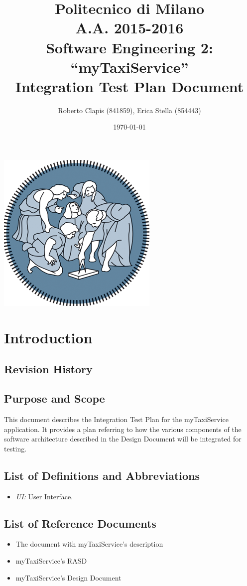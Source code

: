 \documentclass{article}
\author{Roberto Clapis (841859), Erica Stella (854443)}
\date{\today}
\title{Politecnico di Milano
	\\A.A. 2015\@-\@2016
	\\Software Engineering 2: ``myTaxiService''
	\\\textbf{I}ntegration \textbf{T}est \textbf{P}lan \textbf{D}ocument}
\begin{document}
\maketitle
\begin{center}
	\includegraphics{polimi-logo}
\end{center}
\clearpage
\tableofcontents
\clearpage
\section{Introduction}
\subsection{Revision History}
\subsection{Purpose and Scope}
This document describes the Integration Test Plan for the myTaxiService application. It provides a plan referring to how the various components of the software architecture described in the Design Document will be integrated for testing. 
\subsection{List of Definitions and Abbreviations}
\begin{itemize}
	\item \textit{UI:} User Interface. 
\end{itemize}
\subsection{List of Reference Documents}
\begin{itemize}
	\item The document with myTaxiService's description
	\item myTaxiService's RASD
	\item myTaxiService's Design Document
\end{itemize}
\end{document}
